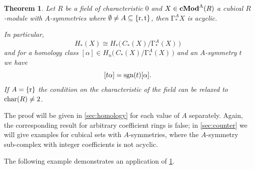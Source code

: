 \documentclass[12pt]{amsart}
\theoremstyle{plain}
\numberwithin{lemma}{\DefaultNumberTheoremWithin}
\numberwithin{claim}{\DefaultNumberTheoremWithin}
\newtheorem{theorem}{Theorem}
\numberwithin{theorem}{\DefaultNumberTheoremWithin}
\numberwithin{corollary}{\DefaultNumberTheoremWithin}
\numberwithin{proposition}{\DefaultNumberTheoremWithin}
\numberwithin{conjecture}{\DefaultNumberTheoremWithin}
\theoremstyle{definition}
\theoremstyle{definition}
\numberwithin{question}{\DefaultNumberTheoremWithin}
\theoremstyle{definition}
\numberwithin{problem}{\DefaultNumberTheoremWithin}
\theoremstyle{remark}
\numberwithin{remark}{\DefaultNumberTheoremWithin}
\theoremstyle{remark}
\numberwithin{example}{\DefaultNumberTheoremWithin}
\def\blt{*}
\def\sgn{\textnormal{sgn}}
\def\rev{\textnormal{r}}
\def\trp{\textnormal{t}}
\def\Con{\mathrm{\Gamma}}  %
\def\ACon{\Con^A} %
\newcommand{\cMod}[2]{\mathbf{cMod}^{\textnormal{#1}}(#2)}  %
\begin{document}
\begin{theorem} \label{mainCub}
    Let $R$ be a field of characteristic $0$ and $X\in\cMod{A}{R}$ a cubical $R$-module with $A$-symmetries where $\emptyset \neq A \subseteq\{\rev,\trp\}$,
    then $\ACon_\blt X$ is acyclic.

    In particular, $$H_*(X) \cong H_*\big(\,C_*(X)/\ACon_* (X)\,\big)$$ and
    for a homology class $[\alpha] \in H_n\big(\,C_*(X)/\ACon_* (X)\,\big)$
    and an $A$-symmetry $t$ we have $$[t \alpha] = \sgn(t) [\alpha].$$ 
     If $A=\{\rev\}$ the condition on the characteristic of the field can be relaxed to $\textnormal{char}(R)\neq 2$.
\end{theorem}
The proof will be given in \ref{sec:homology} for each value of $A$ separately.
Again, the corresponding result for arbitrary coefficient rings is false; in \ref{sec:counter} we will give examples for cubical sets with $A$-symmetries, where the $A$-symmetry sub-complex with integer coefficients is not acyclic. 

The following example demonstrates an application of \ref{mainCub}. 
 
\end{document}
